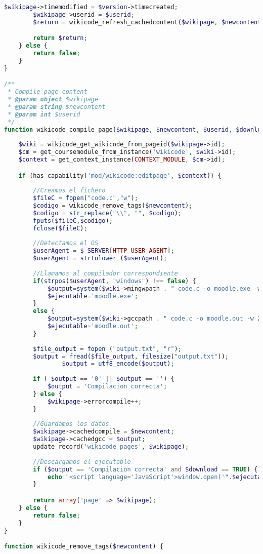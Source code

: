 \begin{lstlisting}[language=PHP]
        $wikipage->timemodified = $version->timecreated;
        $wikipage->userid = $userid;
        $return = wikicode_refresh_cachedcontent($wikipage, $newcontent);

        return $return;
    } else {
        return false;
    }
}

/**
 * Compile page content
 * @param object $wikipage
 * @param string $newcontent
 * @param int $userid
 */
function wikicode_compile_page($wikipage, $newcontent, $userid, $download) {
        
    $wiki = wikicode_get_wikicode_from_pageid($wikipage->id);
    $cm = get_coursemodule_from_instance('wikicode', $wiki->id);
    $context = get_context_instance(CONTEXT_MODULE, $cm->id);

    if (has_capability('mod/wikicode:editpage', $context)) {
    	
		//Creamos el fichero
		$fileC = fopen("code.c","w"); 
		$codigo = wikicode_remove_tags($newcontent);
		$codigo = str_replace("\\", "", $codigo);
		fputs($fileC,$codigo); 
		fclose($fileC);
		
		//Detectamos el OS
		$userAgent = $_SERVER[HTTP_USER_AGENT];
		$userAgent = strtolower ($userAgent);
		
		//Llamamos al compilador correspondiente
		if(strpos($userAgent, "windows") !== false) {
        	$output=system($wiki->mingwpath . " code.c -o moodle.exe -w 2> output.txt");
			$ejecutable='moodle.exe';
		}
		else {
			$output=system($wiki->gccpath . " code.c -o moodle.out -w 2> output.txt");
			$ejecutable='moodle.out';
		}
		
		$file_output = fopen ("output.txt", "r");
   		$output = fread($file_output, filesize("output.txt"));
            	$output = utf8_encode($output);
		
		if ( $output == '0' || $output == '') {
			$output = 'Compilacion correcta';
		} else {
			$wikipage->errorcompile++;
		}
		
        //Guardamos los datos
        $wikipage->cachedcompile = $newcontent;
		$wikipage->cachedgcc = $output;
		update_record('wikicode_pages', $wikipage);
		
		//Descargamos el ejecutable
		if ($output == 'Compilacion correcta' and $download == TRUE) {
			echo "<script language='JavaScript'>window.open('".$ejecutable."')</script>";
		}

        return array('page' => $wikipage);
    } else {
        return false;
    }
}

function wikicode_remove_tags($newcontent) {
	

\end{lstlisting}
